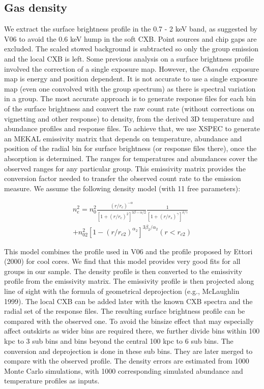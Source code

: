 \documentclass{aastex}
\def\chandra    {{\em Chandra}\/}
\begin{document}
\subsection{Gas density}

We extract the surface brightness profile in the 0.7 - 2 keV band, as suggested by
V06 to avoid the 0.6 keV hump in the soft CXB. Point sources and chip gaps
are excluded. The scaled stowed background is subtracted so only the group emission
and the local CXB is left. Some previous analysis on a surface brightness profile involved
the correction of a single exposure map.
However, the \chandra\ exposure map is energy and position dependent.
It is not accurate to use a single exposure map (even one convolved with the group
spectrum) as there is spectral variation in a group. The most accurate approach is
to generate response files for each bin of the surface brightness and convert the
raw count rate (without corrections on vignetting and other response) to density, from
the derived 3D temperature and abundance profiles and response files.
To achieve that, we use XSPEC to generate an MEKAL emissivity matrix that depends on temperature,
abundance and position of the radial bin for surface brightness (or response files there),
once the absorption is determined. The ranges for
temperatures and abundances cover the observed ranges for any particular group.
This emissivity matrix provides the conversion factor needed to transfer the
observed count rate to the emission measure.
We assume the following density model (with 11 free parameters):

\begin{eqnarray}
n_{e}^{2} = n_{0}^{2} \frac{(r/r_{c})^{-\alpha}}{[1+(r/r_{c})^{2}]^{3\beta-\alpha/2}}
\frac{1}{[1+(r/r_{s})^{\gamma}]^{\delta/\gamma}} \nonumber \\
+ n_{02}^{2} [1-(r/r_{c2})^{\alpha_{2}}]^{3\beta_{2}/\alpha_{2}} (r < r_{c2})
\end{eqnarray}

This model combines the profile used in V06 and the profile proposed by Ettori (2000) for
cool cores. We find that this model provides very good fits for all groups in our sample.
The density profile is then converted to the emissivity profile from the emissivity matrix.
The emissivity profile is then projected
along line of sight with the formula of geometrical deprojection (e.g.,
McLaughlin 1999). The local CXB can be added later with the known CXB spectra and the radial
set of the response files. The resulting surface brightness profile can be compared with
the observed one. 
To avoid the binsize effect that may especially affect outskirts as wider bins are required
there, we further divide bins within 100 kpc to 3 sub bins and bins beyond the central
100 kpc to 6 sub bins. The conversion and deprojection is done in these sub bins.
They are later merged to compare with the observed profile.
The density errors are estimated from 1000 Monte Carlo simulations, with 1000 corresponding
simulated abundance and temperature profiles as inputs.
\end{document}

